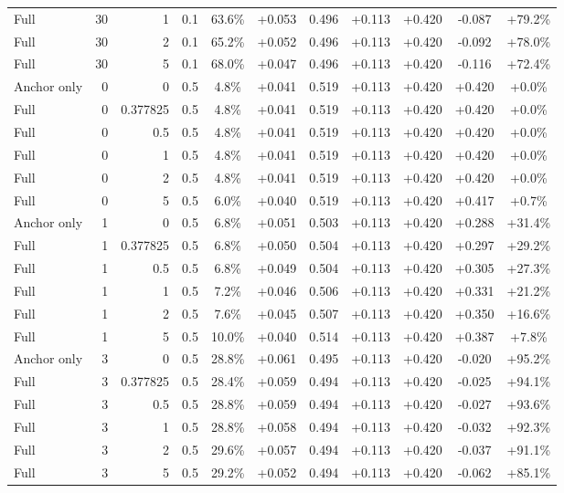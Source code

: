 \begin{table}[htbp]
\begin{tabular}{lrrrccccccc}
Full & 30 & 1 & 0.1 & 63.6\% & +0.053 & 0.496 & +0.113 & +0.420 & -0.087 & +79.2\% \\
Full & 30 & 2 & 0.1 & 65.2\% & +0.052 & 0.496 & +0.113 & +0.420 & -0.092 & +78.0\% \\
Full & 30 & 5 & 0.1 & 68.0\% & +0.047 & 0.496 & +0.113 & +0.420 & -0.116 & +72.4\% \\
Anchor only & 0 & 0 & 0.5 & 4.8\% & +0.041 & 0.519 & +0.113 & +0.420 & +0.420 & +0.0\% \\
Full & 0 & 0.377825 & 0.5 & 4.8\% & +0.041 & 0.519 & +0.113 & +0.420 & +0.420 & +0.0\% \\
Full & 0 & 0.5 & 0.5 & 4.8\% & +0.041 & 0.519 & +0.113 & +0.420 & +0.420 & +0.0\% \\
Full & 0 & 1 & 0.5 & 4.8\% & +0.041 & 0.519 & +0.113 & +0.420 & +0.420 & +0.0\% \\
Full & 0 & 2 & 0.5 & 4.8\% & +0.041 & 0.519 & +0.113 & +0.420 & +0.420 & +0.0\% \\
Full & 0 & 5 & 0.5 & 6.0\% & +0.040 & 0.519 & +0.113 & +0.420 & +0.417 & +0.7\% \\
Anchor only & 1 & 0 & 0.5 & 6.8\% & +0.051 & 0.503 & +0.113 & +0.420 & +0.288 & +31.4\% \\
Full & 1 & 0.377825 & 0.5 & 6.8\% & +0.050 & 0.504 & +0.113 & +0.420 & +0.297 & +29.2\% \\
Full & 1 & 0.5 & 0.5 & 6.8\% & +0.049 & 0.504 & +0.113 & +0.420 & +0.305 & +27.3\% \\
Full & 1 & 1 & 0.5 & 7.2\% & +0.046 & 0.506 & +0.113 & +0.420 & +0.331 & +21.2\% \\
Full & 1 & 2 & 0.5 & 7.6\% & +0.045 & 0.507 & +0.113 & +0.420 & +0.350 & +16.6\% \\
Full & 1 & 5 & 0.5 & 10.0\% & +0.040 & 0.514 & +0.113 & +0.420 & +0.387 & +7.8\% \\
Anchor only & 3 & 0 & 0.5 & 28.8\% & +0.061 & 0.495 & +0.113 & +0.420 & -0.020 & +95.2\% \\
Full & 3 & 0.377825 & 0.5 & 28.4\% & +0.059 & 0.494 & +0.113 & +0.420 & -0.025 & +94.1\% \\
Full & 3 & 0.5 & 0.5 & 28.8\% & +0.059 & 0.494 & +0.113 & +0.420 & -0.027 & +93.6\% \\
Full & 3 & 1 & 0.5 & 28.8\% & +0.058 & 0.494 & +0.113 & +0.420 & -0.032 & +92.3\% \\
Full & 3 & 2 & 0.5 & 29.6\% & +0.057 & 0.494 & +0.113 & +0.420 & -0.037 & +91.1\% \\
Full & 3 & 5 & 0.5 & 29.2\% & +0.052 & 0.494 & +0.113 & +0.420 & -0.062 & +85.1\% \\

\end{tabular}
\end{table}
